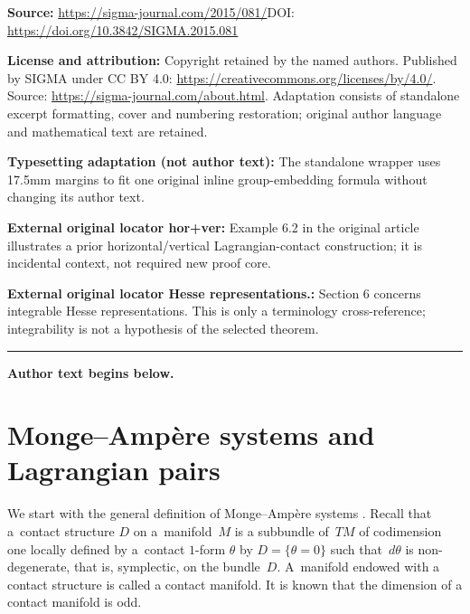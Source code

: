 \documentclass[11pt]{article}
\begin{document}
\noindent\textbf{Source:} \url{https://sigma-journal.com/2015/081/}\quad DOI: \url{https://doi.org/10.3842/SIGMA.2015.081}\par
\noindent\textbf{License and attribution:} Copyright retained by the named authors. Published by SIGMA under CC BY 4.0: \url{https://creativecommons.org/licenses/by/4.0/}. Source: \url{https://sigma-journal.com/about.html}. Adaptation consists of standalone excerpt formatting, cover and numbering restoration; original author language and mathematical text are retained.\par
\noindent\textbf{Typesetting adaptation (not author text):} The standalone wrapper uses 17.5mm margins to fit one original inline group-embedding formula without changing its author text.\par
\noindent\textbf{External original locator hor+\allowbreak{}ver:} Example 6.2 in the original article illustrates a prior horizontal/vertical Lagrangian-contact construction; it is incidental context, not required new proof core.\par
\noindent\textbf{External original locator Hesse representations.:} Section 6 concerns integrable Hesse representations. This is only a terminology cross-reference; integrability is not a hypothesis of the selected theorem.\par
\medskip\hrule\medskip\noindent\textbf{Author text begins below.}\par
\setcounter{section}{1}
\setcounter{subsection}{0}
\setcounter{subsubsection}{0}
\setcounter{Th}{0}
\setcounter{equation}{0}
\section[Monge-Amp{\`e}re systems and Lagrangian pairs]{Monge--Amp{\`e}re systems and Lagrangian pairs}
\label{Monge-Ampere systems and Lagrangian pairs}

We start with the general def\/inition of Monge--Amp{\`e}re systems
\cite{B-G-G,L, Mo1,Mo2}.
Recall that a~contact structure $D$ on a~mani\-fold~$M$
is a subbundle of~$TM$ of codimension one locally def\/ined by a~contact
$1$-form $\theta$ by $D = \{ \theta = 0\}$ such that~$d\theta$ is non-degenerate,
that is, symplectic, on the bundle~$D$.
A~manifold endowed with a contact structure is called a contact manifold.
It is known that the dimension of a contact manifold is odd.
\end{document}
